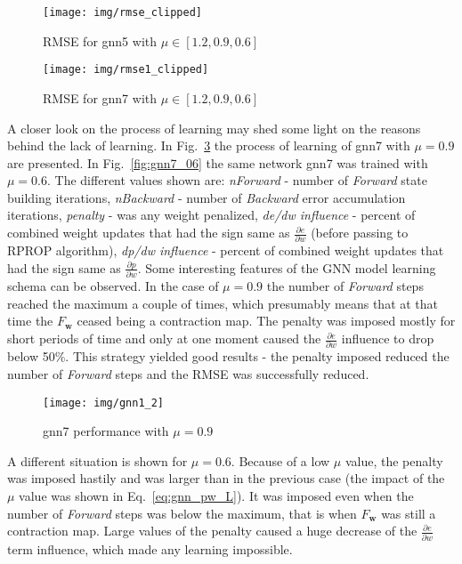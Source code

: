\begin{figure}[h!]
\begin{center}
	\texttt{[image: img/rmse\_clipped]}
	\caption{RMSE for gnn5 with $\mu \in [1.2, 0.9, 0.6]$}
	\label{fig:gnn5}
\end{center}
\end{figure}

\begin{figure}[h!]
\begin{center}
	\texttt{[image: img/rmse1\_clipped]}
	\caption{RMSE for gnn7 with $\mu \in [1.2, 0.9, 0.6]$}
	\label{fig:gnn7}
\end{center}
\end{figure}

A closer look on the process of learning may shed some light on the reasons behind the lack of learning. In Fig.~\ref{fig:gnn7_09} the process of learning of gnn7 with $\mu = 0.9$ are presented. In Fig.~\ref{fig:gnn7_06} the same network gnn7 was trained with $\mu = 0.6$. The different values shown are: \emph{nForward} - number of \emph{Forward} state building iterations, \emph{nBackward} - number of \emph{Backward} error accumulation iterations, \emph{penalty} - was any weight penalized, \emph{de/dw influence} - percent of combined weight updates that had the sign same as $\frac{\partial e}{\partial w}$ (before passing to RPROP algorithm), \emph{dp/dw influence} - percent of combined weight updates that had the sign same as $\frac{\partial p}{\partial w}$. Some interesting features of the GNN model learning schema can be observed. In the case of $\mu = 0.9$ the number of \emph{Forward} steps reached the maximum a couple of times, which presumably means that at that time the $F_{\bm{w}}$ ceased being a contraction map. The penalty was imposed mostly for short periods of time and only at one moment caused the $\frac{\partial e}{\partial w}$ influence to drop below 50\%. This strategy yielded good results - the penalty imposed reduced the number of \emph{Forward} steps and the RMSE was successfully reduced.

\begin{figure}[h!]
\begin{center}
	\texttt{[image: img/gnn1\_2]}
	\caption{gnn7 performance with $\mu = 0.9$}
	\label{fig:gnn7_09}
\end{center}
\end{figure}

A different situation is shown for $\mu = 0.6$. Because of a low $\mu$ value, the penalty was imposed hastily and was larger than in the previous case (the impact of the $\mu$ value was shown in Eq.~\ref{eq:gnn_pw_L}). It was imposed even when the number of \emph{Forward} steps was below the maximum, that is when $F_{\bm{w}}$ was still a contraction map. Large values of the penalty caused a huge decrease of the $\frac{\partial e}{\partial w}$ term influence, which made any learning impossible.

